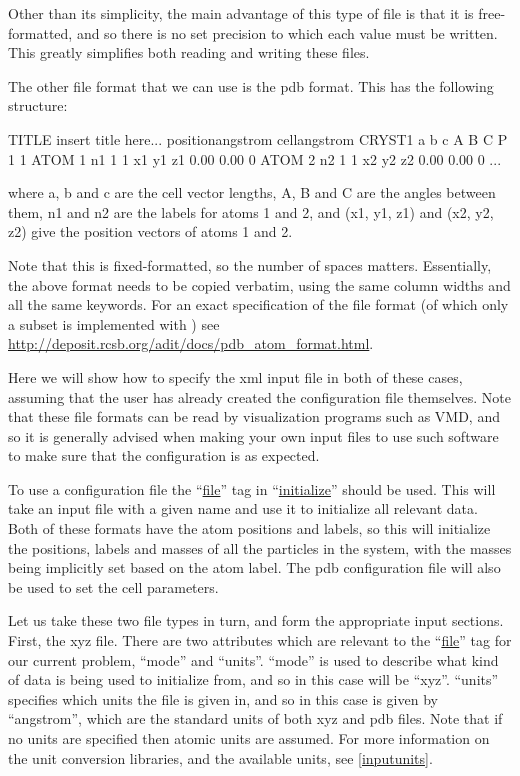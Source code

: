 \documentclass[11pt,english,fleqn]{report}
\newenvironment{code}{%
\footnotesize 
\verbatim
}{
\endverbatim
\normalsize
}
\begin{document}
Other than its simplicity, the main advantage of this type of file
is that it is free-formatted, and so there is no set precision
to which each value must be written. This greatly simplifies
both reading and writing these files.

The other file format that we can use is the pdb format. This
has the following structure:

\begin{code}
TITLE insert title here... position{angstrom} cell{angstrom}
CRYST1        a        b        c      A      B      C P 1           1
ATOM      1   n1   1     1          x1      y1      z1  0.00  0.00             0
ATOM      2   n2   1     1          x2      y2      z2  0.00  0.00             0
...
\end{code}
where a, b and c are the cell vector lengths, A, B and C are the angles between
them, n1 and n2 are the labels for atoms 1 and 2, and (x1, y1, z1)
and (x2, y2, z2) give the position vectors of atoms 1 and 2. 

Note that this is
fixed-formatted, so the number of spaces matters. Essentially, the
above format needs to be copied verbatim, using the same column
widths and all the same keywords. For an exact specification
of the file format (of which only a subset is implemented 
with \ipi) see
\url{http://deposit.rcsb.org/adit/docs/pdb_atom_format.html}.

Here we will show how to specify the xml input file
in both of these cases, assuming that the user has already
created the configuration file themselves.
Note that these file formats can be read by
visualization programs such as VMD, and so it is generally advised 
when making your own input files to
use such software to make sure that the configuration is as expected.

To use a configuration file the {}``\hyperref[INITFILE]{file}'' tag in 
{}``\hyperref[INITIALIZER]{initialize}'' should be used.
This will take an input file with a given name and use it to initialize
all relevant data. Both of these formats have the atom
positions and labels, so this will initialize the positions, labels
and masses of all the particles in the system, with the masses being
implicitly set based on the atom label. The pdb configuration file
will also be used to set the cell parameters.

Let us take these two file types in turn, and form the appropriate
input sections. First, the xyz file. 
There are two attributes which are 
relevant to the {}``\hyperref[INITFILE]{file}'' tag
for our current problem, {}``mode'' and {}``units''.
{}``mode'' is used to describe what kind of data is being used to
initialize from, and so in this case will be {}``xyz''.
{}``units'' specifies which units the file is given in, and
so in this case is given by {}``angstrom'', which are the
standard units of both xyz and pdb files. 
Note that if no units are specified then atomic units are assumed.
For more information on the \ipi unit conversion libraries, 
and the available units, see \ref{inputunits}.
\end{document}
